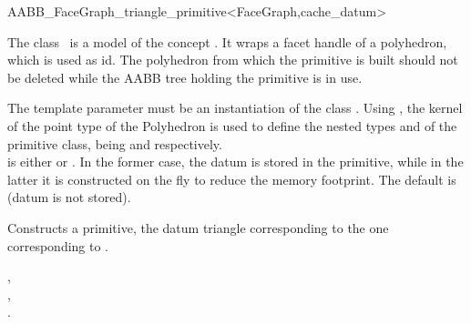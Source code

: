 \ccRefPageBegin

\begin{ccRefClass}{AABB_FaceGraph_triangle_primitive<FaceGraph,cache_datum>}

\ccDefinition
  
The class \ccRefName\ is a model of the concept . It wraps a facet handle of a polyhedron, which is used as id.
The polyhedron from which the primitive is built should not be deleted while the AABB tree holding the primitive is in use.

\ccParameters
The template parameter  must be an instantiation of the class .
Using , the kernel  of the point type of the Polyhedron is used
to define the nested types  and  of the primitive class, being  and  respectively.\\
 is either  or . In the former case, the datum is stored in the primitive, while in the latter it is constructed on the fly to reduce
the memory footprint. The default is  (datum is not stored).


\ccCreation
{}

{Constructs a primitive, the datum triangle corresponding to the one corresponding to .}


\ccSeeAlso

,\\
,\\
.\\

\end{ccRefClass}

\ccRefPageEnd



